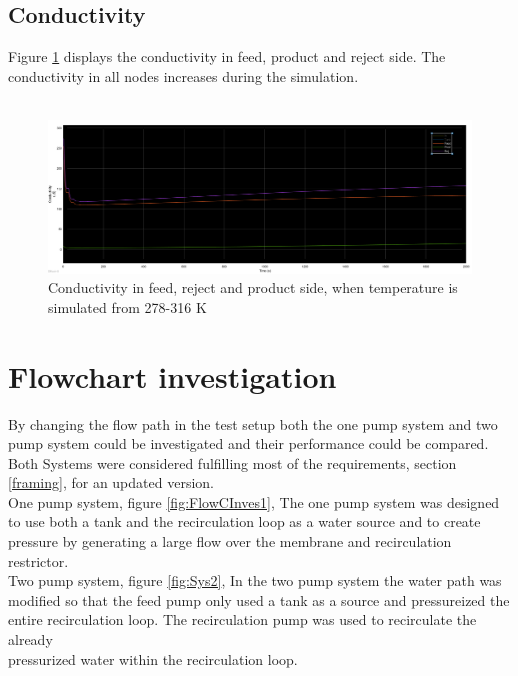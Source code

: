 \subsection{Conductivity}
Figure \ref{fig:conden} displays the conductivity in feed, product and reject side. The conductivity in all nodes increases during the simulation. \\
\\
\begin{figure}[h]
  \label{fig:conden}
  \includegraphics[width=1.1\linewidth]{cond.PNG}
  \caption{Conductivity in feed, reject and product side, when temperature is simulated from 278-316 K}
\end{figure}
\newpage


\section{Flowchart investigation}
By changing the flow path in the test setup both the one pump system and two pump system could be investigated and their performance could be compared. Both Systems were considered fulfilling most of the requirements, section \ref{framing}, for an updated version. \\

One pump system, figure \ref{fig:FlowCInves1}, The one pump system was designed to use both a tank and the recirculation loop as a water source and to create pressure by generating a large flow over the membrane and recirculation restrictor. \\


Two pump system, figure \ref{fig:Sys2}, In the two pump system the water path was modified so that the feed pump only used a tank as a source and pressureized the entire recirculation loop. The recirculation pump was used to recirculate the already\\ pressurized water within the recirculation loop.\\


